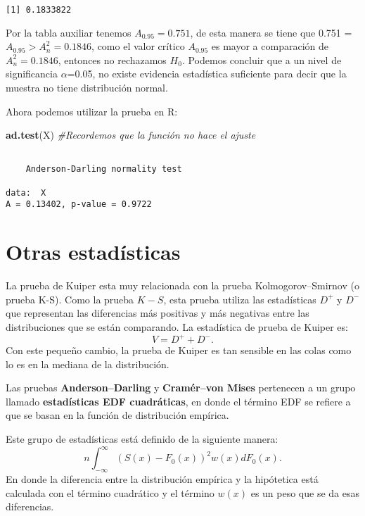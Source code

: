 \documentclass[
  a4paper,
  oneside,
  openany]{book}
\newenvironment{Shaded}{\begin{snugshade}}{\end{snugshade}}
\newcommand{\CommentTok}[1]{\textcolor[rgb]{0.56,0.35,0.01}{\textit{#1}}}
\newcommand{\FunctionTok}[1]{\textcolor[rgb]{0.13,0.29,0.53}{\textbf{#1}}}
\newcommand{\NormalTok}[1]{#1}
\begin{document}
\begin{verbatim}
[1] 0.1833822
\end{verbatim}

Por la tabla auxiliar tenemos \(A_{0.95}=0.751\), de esta manera se tiene que 0.751 = \(A_{0.95} > A_{n}^2=0.1846\), como el valor crítico \(A_{0.95}\) es mayor a comparación de \(A_{n}^2=0.1846\), entonces no rechazamos \(H_0\). Podemos concluir que a un nivel de significancia \(\alpha\)=0.05, no existe evidencia estadística suficiente para decir que la muestra no tiene distribución normal.

\break

Ahora podemos utilizar la prueba en R:

\begin{Shaded}
\begin{Highlighting}[]
\FunctionTok{ad.test}\NormalTok{(X)   }\CommentTok{\#Recordemos que la función no hace el ajuste}
\end{Highlighting}
\end{Shaded}

\begin{verbatim}

    Anderson-Darling normality test

data:  X
A = 0.13402, p-value = 0.9722
\end{verbatim}

\hypertarget{otras-estaduxedsticas}{%
\chapter{Otras estadísticas}\label{otras-estaduxedsticas}}

La prueba de Kuiper esta muy relacionada con la prueba Kolmogorov--Smirnov (o prueba K-S). Como la prueba \(K-S\), esta prueba utiliza las estadísticas \(D^+\) y \(D^-\) que representan las diferencias más positivas y más negativas entre las distribuciones que se están comparando. La estadística de prueba de Kuiper es:
\[V=D^+ + D^-.\]
Con este pequeño cambio, la prueba de Kuiper es tan sensible en las colas como lo es en la mediana de la distribución.

Las pruebas \textbf{Anderson--Darling} y \textbf{Cramér--von Mises} pertenecen a un grupo llamado \textbf{estadísticas EDF cuadráticas}, en donde el término EDF se refiere a que se basan en la función de distribución empírica.

Este grupo de estadísticas está definido de la siguiente manera:
\[n\int_{-\infty}^{\infty}(S(x)-F_0(x))^2w(x)dF_0(x).\]
En donde la diferencia entre la distribución empírica y la hipótetica está calculada con el término cuadrático y el término \(w(x)\) es un peso que se da esas diferencias.
\end{document}
